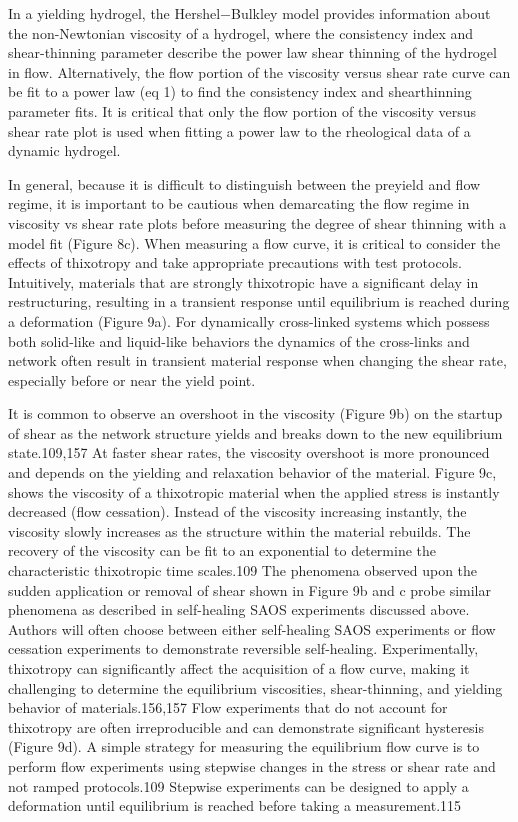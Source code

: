 \documentclass[../../main-notes.tex]{subfiles}
\begin{document}
In a yielding hydrogel, the Hershel−Bulkley model provides information about the non-Newtonian viscosity of a hydrogel, where the consistency index and shear-thinning parameter describe the power law shear thinning of the hydrogel in flow. 
Alternatively, the flow portion of the viscosity versus shear rate curve can be fit to a power law (eq 1) to find the consistency index and shearthinning parameter fits. 
It is critical that only the flow portion of the viscosity versus shear rate plot is used when fitting a power law to the rheological data of a dynamic hydrogel. 

In general, because it is difficult to distinguish between the preyield and flow regime, it is important to be cautious when demarcating the flow regime in viscosity vs shear rate plots before measuring the degree of shear thinning with a model fit (Figure 8c). 
When measuring a flow curve, it is critical to consider the effects of thixotropy and take appropriate precautions with test protocols. 
Intuitively, materials that are strongly thixotropic have a significant delay in restructuring, resulting in a transient response until equilibrium is reached during a deformation (Figure 9a). 
For dynamically cross-linked systemswhich possess both solid-like and liquid-like behaviorsthe dynamics of the cross-links and network often result in transient material response when changing the shear rate, especially before or  near the yield point. 

It is common to observe an overshoot in the viscosity (Figure 9b) on the startup of shear as the network structure yields and breaks down to the new equilibrium state.109,157 
At faster shear rates, the viscosity overshoot is more pronounced and depends on the yielding and relaxation behavior of the material. 
Figure 9c, shows the viscosity of a thixotropic material when the applied stress is instantly decreased (flow cessation). 
Instead of the viscosity increasing instantly, the viscosity slowly increases as the structure within the material rebuilds. 
The recovery of the viscosity can be fit to an exponential to determine the characteristic thixotropic time scales.109 
The phenomena observed upon the sudden application or removal of shear shown in Figure 9b and c probe similar phenomena as described in self-healing SAOS experiments discussed above. 
Authors will often choose between either self-healing SAOS experiments or flow cessation experiments to demonstrate reversible self-healing. 
Experimentally, thixotropy can significantly affect the acquisition of a flow curve, making it challenging to determine the equilibrium viscosities, shear-thinning, and yielding behavior of materials.156,157 
Flow experiments that do not account for thixotropy are often irreproducible and can demonstrate significant hysteresis (Figure 9d). 
A simple strategy for measuring the equilibrium flow curve is to perform flow experiments using stepwise changes in the stress or shear rate and not ramped protocols.109 
Stepwise experiments can be designed to apply a deformation until equilibrium is reached before taking a measurement.115 
\end{document}
